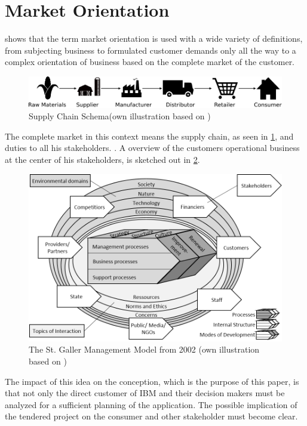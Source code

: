 \section{Market Orientation}
\textcite[9-10]{Claen2016} shows that the term market orientation is used with a wide variety of definitions, from subjecting business to formulated customer demands only all the way to a complex orientation of business based on the complete market of the customer.
\begin{figure}[H]
	\includegraphics[width=\textwidth]{img/supplychain.pdf}
	\caption[Supply Chain Schema]{Supply Chain Schema(own illustration based on \protect\cite{SouthwestTech})}
    	\label{fig:supplychain}
\end{figure}
The complete market in this context means the supply chain, as seen in \ref{fig:supplychain}, and duties to all his stakeholders. \parencite[see.][22-23]{Claen.2016}. A overview of the customers operational business at the center of his stakeholders, is sketched out in \ref{fig:SGM}.
\begin{figure}[H]
	\includegraphics[width=1\textwidth]{img/SGM.png}
	\caption[St. Galler Management Modell]{The St. Galler Management Model from 2002 (own illustration based on \protect\cite{Rueegg.2003})}
	\label{fig:SGM}
\end{figure}
The impact of this idea on the conception, which is the purpose of this paper, is that not only the direct customer of IBM and their decision makers must be analyzed for a sufficient planning of the application. The possible implication of the tendered project on the consumer and other stakeholder must become clear.
